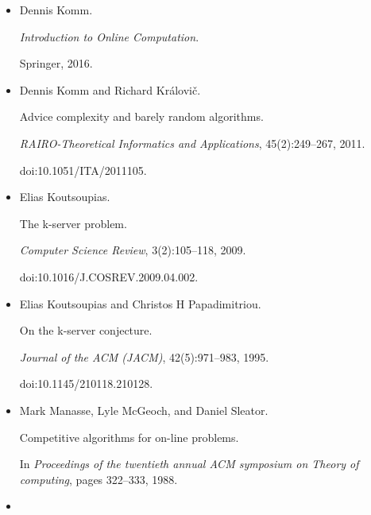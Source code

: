 \begin{itemize}
doi:10.1145/103418.103448.





\item[] 
[26]

Dennis Komm.


\emph{Introduction to Online Computation}.


Springer, 2016.





\item[] 
[27]

Dennis Komm and Richard Královič.


Advice complexity and barely random algorithms.


\emph{RAIRO-Theoretical Informatics and Applications}, 45(2):249–267,
2011.


doi:10.1051/ITA/2011105.





\item[] 
[28]

Elias Koutsoupias.


The k-server problem.


\emph{Computer Science Review}, 3(2):105–118, 2009.


doi:10.1016/J.COSREV.2009.04.002.





\item[] 
[29]

Elias Koutsoupias and Christos H Papadimitriou.


On the k-server conjecture.


\emph{Journal of the ACM (JACM)}, 42(5):971–983, 1995.


doi:10.1145/210118.210128.





\item[] 
[30]

Mark Manasse, Lyle McGeoch, and Daniel Sleator.


Competitive algorithms for on-line problems.


In \emph{Proceedings of the twentieth annual ACM symposium on Theory
of computing}, pages 322–333, 1988.





\item[] 
[31]


\end{itemize}
